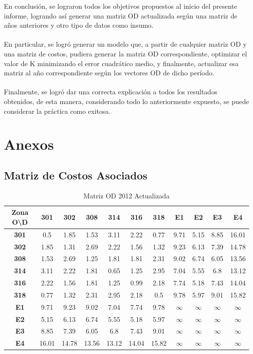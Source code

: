 \documentclass[12pt]{article} %
\begin{document}
En conclusión, se lograron todos los objetivos propuestos al inicio del presente informe, logrando así generar una matriz OD actualizada según una matriz de años anteriores y otro tipo de datos como insumo.
\\ \\
En particular, se logró generar un modelo que, a partir de cualquier matriz OD y una matriz de costos, pudiera generar la matriz OD correspondiente, optimizar el valor de K minimizando el error cuadrático medio, y finalmente, actualizar esa matriz al año correspondiente según los vectores OD de dicho período.
\\ \\
Finalmente, se logró dar una correcta explicación a todos los resultados obtenidos, de esta manera, considerando todo lo anteriormente expuesto, se puede considerar la práctica como exitosa.

\newpage
\section{Anexos}
\subsection{Matriz de Costos Asociados}

\begin{table}[H]
  \centering
  \footnotesize
  \begin{tabular}{c|cccccccccc}    
  \textbf{Zona O\textbackslash D} & \textbf{301} & \textbf{302} & \textbf{308} & \textbf{314} & \textbf{316} & \textbf{318} & \textbf{E1} & \textbf{E2} & \textbf{E3} & \textbf{E4} \\ \hline
  \textbf{301} & 0.5 & 1.85 & 1.53 & 3.11 & 2.22 & 0.77 & 9.71 & 5.15 & 8.85 & 16.01 \\ 
  \textbf{302} & 1.85 & 1.31 & 2.69 & 2.22 & 1.56 & 1.32 & 9.23 & 6.13 & 7.39 & 14.78 \\ 
  \textbf{308} & 1.53 & 2.69 & 1.25 & 1.81 & 1.81 & 2.31 & 9.02 & 6.74 & 6.05 & 13.56 \\ 
  \textbf{314} & 3.11 & 2.22 & 1.81 & 0.65 & 1.25 & 2.95 & 7.04 & 5.55 & 6.8 & 13.12 \\ 
  \textbf{316} & 2.22 & 1.56 & 1.81 & 1.25 & 0.99 & 2.18 & 7.74 & 5.18 & 7.43 & 14.04 \\ 
  \textbf{318} & 0.77 & 1.32 & 2.31 & 2.95 & 2.18 & 0.5 & 9.78 & 5.97 & 9.01 & 15.82 \\ 
  \textbf{E1} & 9.71 & 9.23 & 9.02 & 7.04 & 7.74 & 9.78 & $\infty$ & $\infty$ & $\infty$ & $\infty$ \\ 
  \textbf{E2} & 5.15 & 6.13 & 6.74 & 5.55 & 5.18 & 5.97 & $\infty$ & $\infty$ & $\infty$ & $\infty$ \\ 
  \textbf{E3} & 8.85 & 7.39 & 6.05 & 6.8 & 7.43 & 9.01 & $\infty$ & $\infty$ & $\infty$ & $\infty$ \\ 
  \textbf{E4} & 16.01 & 14.78 & 13.56 & 13.12 & 14.04 & 15.82 & $\infty$ & $\infty$ & $\infty$ & $\infty$ \\ 
  \end{tabular}
  \caption{Matriz OD 2012 Actualizada}
  \label{table:M_2012_actualizada}
\end{table}
\end{document}
